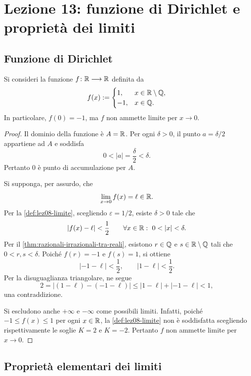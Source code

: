 \chapter[Lezione 13 --- 23 ottobre 2026]{Lezione 13: funzione di Dirichlet e proprietà dei limiti}
\label{chap:lezione-13}

\section{Funzione di Dirichlet}
\label{sec:lez13-dirichlet}

\begin{example}
\label{ex:lez13-dirichlet}
Si consideri la funzione \(f\colon\mathbb{R}\longrightarrow\mathbb{R}\) definita da
\[
  f(x):=
  \begin{cases}
    1, & x\in\mathbb{R}\setminus\mathbb{Q},\\
    -1, & x\in\mathbb{Q}.
  \end{cases}
\]
In particolare, \(f(0)=-1\), ma \(f\) non ammette limite per \(x\to0\).
\end{example}

\begin{proof}
Il dominio della funzione è \(A=\mathbb{R}\). Per ogni \(\delta>0\), il punto
\(a=\delta/2\) appartiene ad \(A\) e soddisfa
\[
  0<|a|=\frac{\delta}{2}<\delta.
\]
Pertanto \(0\) è punto di accumulazione per \(A\).

Si supponga, per assurdo, che
\[
  \lim_{x\to0}f(x)=\ell\in\mathbb{R}.
\]
Per la \cref{def:lez08-limite}, scegliendo
\(\varepsilon=1/2\), esiste \(\delta>0\) tale che
\[
  |f(x)-\ell|<\frac12
  \qquad\forall x\in\R:\ 0<|x|<\delta.
\]
Per il \cref{thm:razionali-irrazionali-tra-reali}, esistono
\(r\in\mathbb{Q}\) e \(s\in\mathbb{R}\setminus\mathbb{Q}\) tali che
\(0<r,s<\delta\). Poiché \(f(r)=-1\) e \(f(s)=1\), si ottiene
\[
  |-1-\ell|<\frac12,
  \qquad
  |1-\ell|<\frac12.
\]
Per la disuguaglianza triangolare, ne segue
\[
  2=|(1-\ell)-(-1-\ell)|
  \le |1-\ell|+|-1-\ell|<1,
\]
una contraddizione.

Si escludono anche \(+\infty\) e \(-\infty\) come possibili limiti.
Infatti, poiché \(-1\le f(x)\le1\) per ogni \(x\in\mathbb{R}\),
la \cref{def:lez08-limite} non è soddisfatta scegliendo
rispettivamente le soglie \(K=2\) e \(K=-2\).
Pertanto \(f\) non ammette limite per \(x\to0\).
\end{proof}

\section{Proprietà elementari dei limiti}
\label{sec:lez13-proprieta-limiti}

